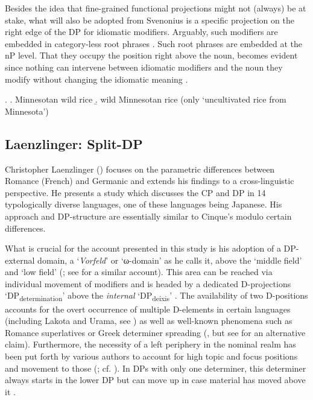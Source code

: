 \documentclass [output=book,colorlinks,citecolor=brown]{langscibook}
\begin{document}
Besides the idea that fine-grained functional projections might not (always) be at stake, what will also be adopted from Svenonius is a specific projection on the right edge of the DP for idiomatic modifiers. Arguably, such modifiers are embedded in category-less root phrases \citep{marantz:1997:no}. Such root phrases are embedded at the nP level. That they occupy the position right above the noun, becomes evident since nothing can intervene between idiomatic modifiers and the noun they modify without changing the idiomatic meaning \citep[36–38]{svenonius:2008:position}. %

\ex. \a. Minnesotan wild rice
\b. wild Minnesotan rice (only `uncultivated rice from Minnesota’) \\ \null \hfill\citep[36–37]{svenonius:2008:position}

\subsection{Laenzlinger: Split-DP} \label{laenzdp}

Christopher Laenzlinger (\citeyear{laenzlinger:1998:comparative, laenzlinger:2005:french, laenzlinger:2010:cp, laenzlinger:2011:elements, laenzlinger:2015:the}) focuses on the parametric differences between Romance (French) and Germanic and extends his findings to a cross-linguistic perspective. He presents a study which discusses the CP and DP in 14 typologically diverse languages, one of these languages being Japanese. His approach and DP-structure are essentially similar to Cinque’s modulo certain differences. %

What is crucial for the account presented in this study is his adoption of a DP-external domain, a `\textit{Vorfeld}’ or `ω-domain’ as he calls it, above the `middle field’ and `low field’ (\citealt[7]{laenzlinger:2011:elements}; see \citealt{grohmann:2003:prolific} for a similar account). This area can be reached via individual movement of modifiers and is headed by a dedicated D-projections `DP\textsubscript{determination}’ above the \textit{internal} `DP\textsubscript{deixis}’ \citep[668–669]{laenzlinger:2005:french}. The availability of two D-positions accounts for the overt occurrence of multiple D-elements in certain languages (including Lakota and Urama, see \citealt[187–193]{becker:2018:articles}) as well as well-known phenomena such as Romance superlatives \citep{bruge:2002:positions, bernstein:2001:focusing} or Greek determiner spreading (\citealt{androutsopoulou:1995:ds}, but see \citealt{lekakou:2012:poly} for an alternative claim). Furthermore, the necessity of a left periphery in the nominal realm has been put forth by various authors to account for high topic and focus positions and movement to those (\citealt{giusti:1996:is, dimitrova:1998:fragments, ihsane:2001:specific, aboh:2004:topic, aboh:2006:when, grohmann:2003:prolific, grohmann:2015:demonstrative}; cf. \citealt[173–178]{laenzlinger:2011:elements}). In DPs with only one determiner, this determiner always starts in the lower DP but can move up in case material has moved above it \citep[667]{laenzlinger:2005:french}.
\end{document}

